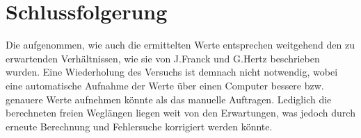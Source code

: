 \section{Schlussfolgerung}
	
	Die aufgenommen, wie auch die ermittelten Werte entsprechen weitgehend den zu erwartenden Verhältnissen, wie sie von J.Franck und G.Hertz beschrieben wurden.	 
	Eine Wiederholung des Versuchs ist demnach nicht notwendig, wobei eine automatische Aufnahme der Werte über einen Computer bessere bzw. genauere Werte aufnehmen könnte als das manuelle Auftragen. 
	Lediglich die berechneten freien Weglängen liegen weit von den Erwartungen, was jedoch durch erneute Berechnung und Fehlersuche korrigiert werden könnte.
	
	









